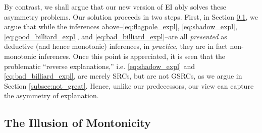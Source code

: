 \documentclass{svjour3}                     %
\begin{document}
By contrast, we shall argue that our new version of EI ably solves these asymmetry problems. Our solution proceeds in two steps. First, in Section \ref{subsec:illusion}, we argue that while the inferences above--\eqref{eq:flagpole_expl}, \eqref{eq:shadow_expl}, \eqref{eq:good_billiard_expl}, and \eqref{eq:bad_billiard_expl}--are all \textit{presented} as deductive (and hence monotonic) inferences, in \textit{practice}, they are in fact non-monotonic inferences. Once this point is appreciated, it is seen that the problematic ``reverse explanations,'' i.e. \eqref{eq:shadow_expl} and \eqref{eq:bad_billiard_expl}, are merely SRCs, but are not GSRCs, as we argue in Section \ref{subsec:not_great}. Hence, unlike our predecessors, our view can capture the asymmetry of explanation.

\subsection{The Illusion of Montonicity}
\label{subsec:illusion}
\end{document}
